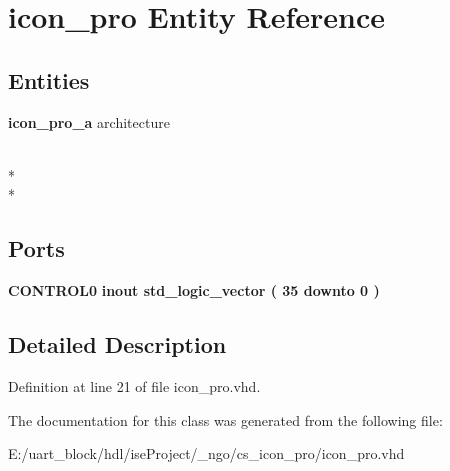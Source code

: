 \section{icon\-\_\-pro Entity Reference}
\label{classicon__pro}
\subsection*{Entities}
\begin{DoxyCompactItemize}
\item 
{\bf icon\-\_\-pro\-\_\-a} architecture
\end{DoxyCompactItemize}
\\*
\\*
\subsection*{Ports}
 \begin{DoxyCompactItemize}
\item 
{\bf C\-O\-N\-T\-R\-O\-L0}  {\bfseries {\bfseries inout }} {\bfseries std\-\_\-logic\-\_\-vector (   35    downto    0  ) } \label{classicon__pro_a24814e100155f2eba6181125c692a3f5}

\end{DoxyCompactItemize}


\subsection{Detailed Description}


Definition at line 21 of file icon\-\_\-pro.\-vhd.



The documentation for this class was generated from the following file\-:\begin{DoxyCompactItemize}
\item 
E\-:/uart\-\_\-block/hdl/ise\-Project/\-\_\-ngo/cs\-\_\-icon\-\_\-pro/icon\-\_\-pro.\-vhd\end{DoxyCompactItemize}
